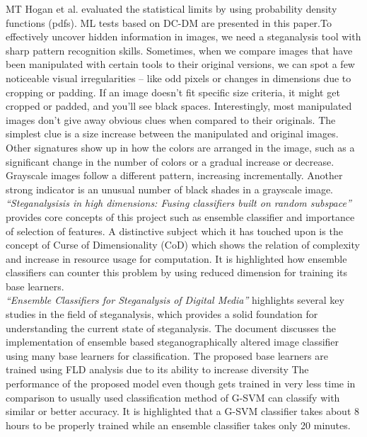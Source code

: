 MT Hogan et al.\cite{3} evaluated the statistical limits by using probability density functions (pdfs). ML tests based on DC-DM are presented in this paper.To effectively uncover hidden information in images, we need a steganalysis tool with sharp pattern recognition skills. Sometimes, when we compare images that have been manipulated with certain tools to their original versions, we can spot a few noticeable visual irregularities – like odd pixels or changes in dimensions due to cropping or padding. If an image doesn't fit specific size criteria, it might get cropped or padded, and you'll see black spaces. Interestingly, most manipulated images don't give away obvious clues when compared to their originals. The simplest clue is a size increase between the manipulated and original images. Other signatures show up in how the colors are arranged in the image, such as a significant change in the number of colors or a gradual increase or decrease. Grayscale images follow a different pattern, increasing incrementally. Another strong indicator is an unusual number of black shades in a grayscale image.\\
\textit{``Steganalysisis in high dimensions: Fusing classifiers built on random subspace''}\cite{8} provides core concepts of this project such as ensemble classifier and importance of selection of features. A distinctive subject which it has touched upon is the concept of Curse of Dimensionality (CoD) which shows the relation of complexity and increase in  resource usage for computation. It is highlighted how ensemble classifiers can counter this problem by using reduced dimension for training its base learners.\\
\textit{``Ensemble Classifiers for Steganalysis of Digital Media''}\cite{5} highlights several key studies in the field of steganalysis, which provides a solid foundation for understanding the current state of steganalysis. The document discusses the implementation of ensemble based steganographically altered image classifier using many base learners for classification. The proposed base learners are trained using FLD analysis due to its ability to increase diversity The performance of the proposed model even though gets trained in very less time in comparison to usually used classification method of G-SVM can classify with similar or better accuracy. It is highlighted that a G-SVM classifier takes about 8 hours to be properly trained while an ensemble classifier takes only 20 minutes.\\                   
